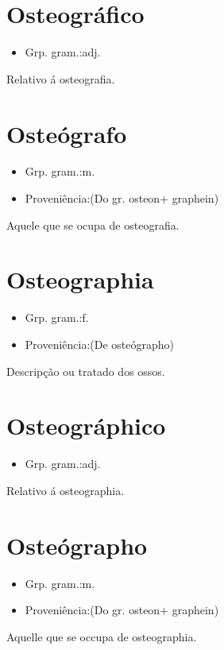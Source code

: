 \section{Osteográfico}
\begin{itemize}
\item {Grp. gram.:adj.}
\end{itemize}
Relativo á osteografia.
\section{Osteógrafo}
\begin{itemize}
\item {Grp. gram.:m.}
\end{itemize}
\begin{itemize}
\item {Proveniência:(Do gr. \textunderscore osteon\textunderscore  + \textunderscore graphein\textunderscore )}
\end{itemize}
Aquele que se ocupa de osteografia.
\section{Osteographia}
\begin{itemize}
\item {Grp. gram.:f.}
\end{itemize}
\begin{itemize}
\item {Proveniência:(De \textunderscore osteógrapho\textunderscore )}
\end{itemize}
Descripção ou tratado dos ossos.
\section{Osteográphico}
\begin{itemize}
\item {Grp. gram.:adj.}
\end{itemize}
Relativo á osteographia.
\section{Osteógrapho}
\begin{itemize}
\item {Grp. gram.:m.}
\end{itemize}
\begin{itemize}
\item {Proveniência:(Do gr. \textunderscore osteon\textunderscore  + \textunderscore graphein\textunderscore )}
\end{itemize}
Aquelle que se occupa de osteographia.
